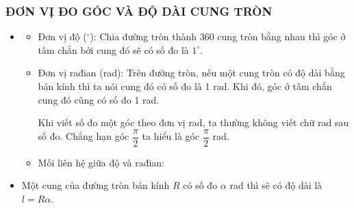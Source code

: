 \subsubsection{ĐƠN VỊ ĐO GÓC VÀ ĐỘ DÀI CUNG TRÒN}
\begin{itemize}
	\item[\iconMT] 
	\begin{itemize}
		\item Đơn vị độ ($^\circ$): Chia đường tròn thành 360 cung tròn bằng nhau thì góc ở tâm chắn bởi cung đó sẽ có số đo là $1^\circ$.
		\item Đơn vị rađian (rad): Trên đường tròn, nếu một cung tròn có độ dài bằng bán kính thì ta nói cung đó có số đo là 1 rad. Khi đó, góc ở tâm chắn cung đó cũng có số đo 1 rad.
		\begin{luuy}
			Khi viết số đo một góc theo đơn vị rad, ta thường không viết chữ rad sau số đo. Chẳng hạn góc $\dfrac{\pi}{2}$ ta hiểu là góc $\dfrac{\pi}{2}$ rad.
		\end{luuy}
		\item Mối liên hệ giữa độ và rađian:
	\end{itemize}
	\item[\iconMT]  Một cung của đường tròn bán kính $R$ có số đo $\alpha$ rad thì sẽ có độ dài là $l=R\alpha$.
\end{itemize}

